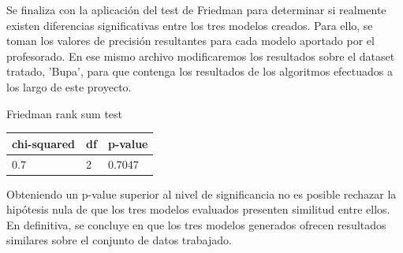 Se finaliza con la aplicación del test de Friedman para determinar si realmente existen diferencias significativas entre los tres modelos creados. Para ello, se toman los valores de precisión resultantes para cada modelo aportado por el profesorado. En ese mismo archivo modificaremos los resultados sobre el dataset tratado, 'Bupa', para que contenga los resultados de los algoritmos efectuados a los largo de este proyecto.

Friedman rank sum test
\begin{table}[!h]
	\centering
	\begin{tabular}{lll}
		chi-squared & df & p-value \\ \hline
		0.7      & 2  & 0.7047
	\end{tabular}
\end{table}

Obteniendo un p-value superior al nivel de significancia no es posible rechazar la hipótesis nula de que los tres modelos evaluados presenten similitud entre ellos. En definitiva, se concluye en que los tres modelos generados ofrecen resultados similares sobre el conjunto de datos trabajado.














